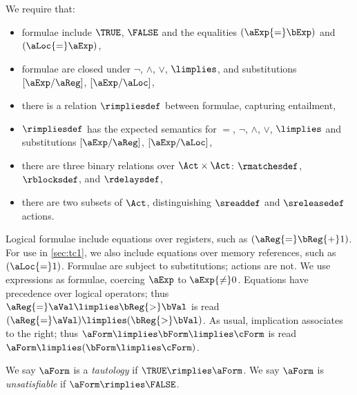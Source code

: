 We require that:
\begin{itemize}
\item formulae include $\TRUE$, $\FALSE$ and the equalities $(\aExp{=}\bExp)$ and $(\aLoc{=}\aExp)$,
\item formulae are closed under $\lnot$, $\land$, $\lor$, $\limplies$, and
  substitutions $[\aExp/\aReg]$, $[\aExp/\aLoc]$,
\item there is a relation $\rimpliesdef$ between
  formulae, capturing entailment, %
\item $\rimpliesdef$ has the expected semantics for $=$, $\lnot$,
  $\land$, $\lor$, $\limplies$ and substitutions $[\aExp/\aReg]$, $[\aExp/\aLoc]$,
\item there are three binary relations over $\Act\times\Act$:
  $\rmatchesdef$, $\rblocksdef$, and $\rdelaysdef$,
\item there are two subsets of $\Act$, distinguishing
  $\sreaddef$ and $\sreleasedef$ actions.
\end{itemize}

Logical formulae include equations over registers, such as
$(\aReg{=}\bReg{+}1)$.
For use in \textsection\ref{sec:tc1}, we also include equations over memory references, such as $(\aLoc{=}1)$.
Formulae are subject to substitutions; %
actions are not.
We use expressions as formulae, coercing $\aExp$ to $\aExp{\neq}0$.
Equations have precedence over logical operators; thus
$\aReg{=}\aVal\limplies\bReg{>}\bVal$ is read
$(\aReg{=}\aVal)\limplies(\bReg{>}\bVal)$.  As usual, implication associates to the
right; thus $\aForm\limplies\bForm\limplies\cForm$ is read
$\aForm\limplies(\bForm\limplies\cForm)$.

We say
$\aForm$ is a \emph{tautology} if $\TRUE \rimplies \aForm$.
We say
$\aForm$ is \emph{unsatisfiable} if $\aForm \rimplies \FALSE$.


